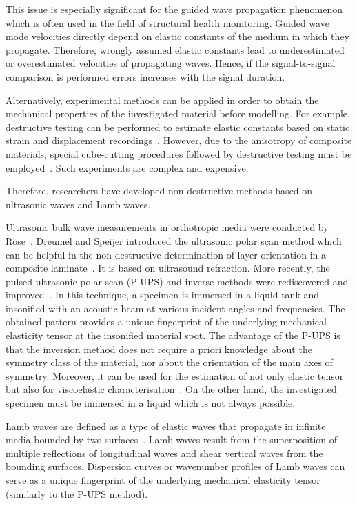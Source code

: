 \documentclass[preprint,12pt]{elsarticle}
\begin{document}
This issue is especially significant for the guided wave propagation phenomenon which is often used in the field of structural health monitoring. 
Guided wave mode velocities directly depend on elastic constants of the medium in which they propagate.
Therefore, wrongly assumed elastic constants lead to underestimated or overestimated velocities of propagating waves. 
Hence, if the signal-to-signal comparison is performed errors increases with the signal duration.

Alternatively, experimental methods can be applied in order to obtain the mechanical properties of the investigated material before modelling. 
For example, destructive testing can be performed to estimate elastic constants based on static strain and displacement recordings~\cite{Wang2000,Petersen2016}.
However, due to the anisotropy of composite materials, special cube-cutting procedures followed by destructive testing must be employed~\cite{Rose1991}.
Such experiments are complex and expensive.

Therefore, researchers have developed non-destructive methods based on ultrasonic waves and Lamb waves.

Ultrasonic bulk wave measurements in orthotropic media were conducted by Rose~\cite{Rose1999}.
Dreumel and Speijer introduced the ultrasonic polar scan method which can be helpful in the non-destructive determination of layer orientation in a composite laminate~\cite{VanDreumel1982}. 
It is based on ultrasound refraction.
More recently, the pulsed ultrasonic polar scan (P-UPS) and inverse methods were rediscovered and improved~\cite{Kersemans2014,Martens2017}. 
In this technique, a specimen is immersed in a liquid tank and insonified with an acoustic beam at various incident angles and frequencies. 
The obtained pattern provides a unique fingerprint of the underlying mechanical elasticity tensor at the insonified material spot.
The advantage of the P-UPS is that the inversion method does not require a priori knowledge about the symmetry class of the material, nor about the orientation of the main axes of symmetry.
Moreover, it can be used for the estimation of not only elastic tensor but also for viscoelastic characterisation~\cite{Martens2019}.	
On the other hand, the investigated specimen must be immersed in a liquid which is not always possible.

Lamb waves are defined as a type of elastic waves that propagate in infinite media bounded by two surfaces~\cite{Rose1999}. 
Lamb waves result from the superposition of multiple reflections of longitudinal waves and shear vertical waves from the bounding surfaces.
Dispersion curves or wavenumber profiles of Lamb waves can serve as a unique fingerprint of the underlying mechanical elasticity tensor (similarly to the P-UPS method).
\end{document}
